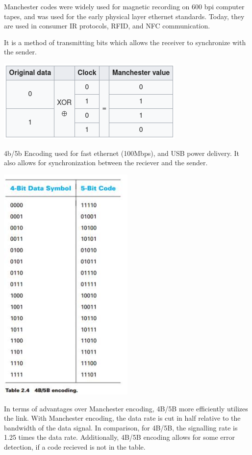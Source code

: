 Manchester codes were widely used for magnetic recording on 600 bpi computer
tapes, and was used for the early physical layer ethernet standards.
Today, they are used in consumer IR protocols, RFID, and NFC communication.

It is a method of transmitting bits which allows the receiver to synchronize
with the sender.



\includegraphics*[width=\textwidth]{manchester.png}

4b/5b Encoding used for fast ethernet (100Mbps), and USB power delivery. It also
allows for synchronization between the reciever and the sender.

\includegraphics*[width=0.5\textwidth]{4b5b.jpg}




In terms of advantages over Manchester encoding, 4B/5B more efficiently utilizes
the link. With Manchester encoding, the data rate is cut in half relative to the
bandwidth of the data signal.  In comparison, for 4B/5B, the signalling rate is
1.25 times the data rate. Additionally, 4B/5B encoding allows for some error
detection, if a code recieved is not in the table.
